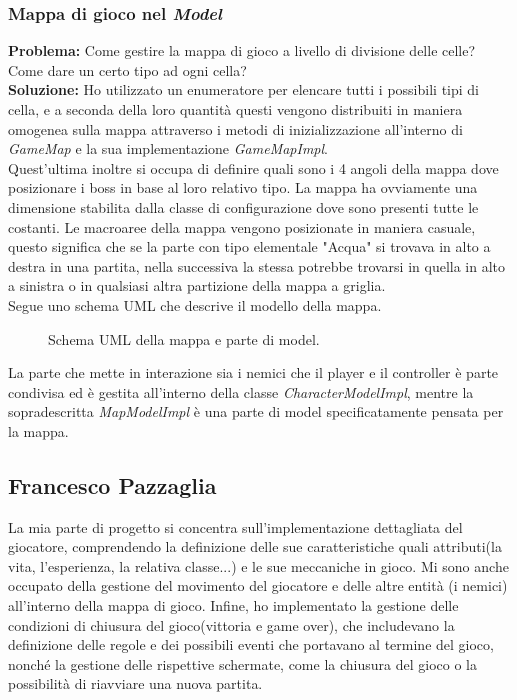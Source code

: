 \documentclass[a4paper,12pt]{report}
\begin{document}
\subsubsection{Mappa di gioco nel \textit{Model}}
\textbf{Problema:} Come gestire la mappa di gioco a livello di divisione delle celle? Come dare un certo tipo ad ogni cella?\\
\textbf{Soluzione:} Ho utilizzato un enumeratore per elencare tutti i possibili tipi di cella, e a seconda della loro quantità questi vengono distribuiti in maniera omogenea sulla mappa attraverso i metodi di inizializzazione all'interno di \textit{GameMap} e la sua implementazione \textit{GameMapImpl}.\\ Quest'ultima inoltre si occupa di definire quali sono i 4 angoli della mappa dove posizionare i boss in base al loro relativo tipo. La mappa ha ovviamente una dimensione stabilita dalla classe di configurazione dove sono presenti tutte le costanti.
Le macroaree della mappa vengono posizionate in maniera casuale, questo significa che se la parte con tipo elementale "Acqua" si trovava in alto a destra in una partita, nella successiva la stessa potrebbe trovarsi in quella in alto a sinistra o in qualsiasi altra partizione della mappa a griglia.\\
Segue uno schema UML che descrive il modello della mappa.

\begin{figure}[H]
	\centering
	
	\caption{Schema UML della mappa e parte di model.}
	\label{fig:Schema UML della mappa e parte di model.}
\end{figure}

La parte che mette in interazione sia i nemici che il player e il controller è parte condivisa ed è gestita all'interno della classe \textit{CharacterModelImpl}, mentre la sopradescritta \textit{MapModelImpl} è una parte di model specificatamente pensata per la mappa.

\subsection{Francesco Pazzaglia}
La mia parte di progetto si concentra sull'implementazione dettagliata del giocatore, comprendendo la definizione delle sue caratteristiche quali attributi(la vita, l'esperienza, la relativa classe...) e le sue meccaniche in gioco. Mi sono anche occupato della gestione del movimento del giocatore e delle altre entità (i nemici) all'interno della mappa di gioco. Infine, ho implementato la gestione delle condizioni di chiusura del gioco(vittoria e game over), che includevano la definizione delle regole e dei possibili eventi che portavano al termine del gioco, nonché la gestione delle rispettive schermate, come la chiusura del gioco o la possibilità di riavviare una nuova partita.
\end{document}
